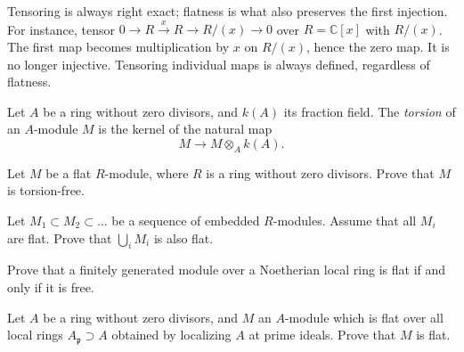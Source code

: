 Tensoring is always right exact; flatness
is what also preserves the first
injection. For instance, tensor
$0\to R\xrightarrow{x}R\to R/(x)\to0$
over $R=\mathbb{C}[x]$ with $R/(x)$.
The first map becomes multiplication by
$x$ on $R/(x)$, hence the zero map.
It is no longer injective.
Tensoring individual maps is always
defined, regardless of flatness.

\begin{definition}
\label{definition-torsion-module}
Let $A$ be a ring without zero divisors,
and $k(A)$ its fraction field.
The {\it torsion} of an $A$-module $M$
is the kernel of the natural map
$$
M \to M \otimes_A k(A).
$$
\end{definition}

\begin{exercise}
\label{exercise-flat-modules-torsion-free}
Let $M$ be a flat $R$-module,
where $R$ is a ring without zero divisors.
Prove that $M$ is torsion-free.
\end{exercise}

\begin{exercise}
\label{exercise-union-flat-modules-flat}
Let
$
M_1 \subset M_2 \subset \ldots
$
be a sequence of embedded $R$-modules.
Assume that all $M_i$ are flat.
Prove that
$
\bigcup_i M_i
$
is also flat.
\end{exercise}

\begin{exercise}
\label{exercise-flat-finite-local-free}
Prove that a finitely generated module
over a Noetherian local ring is flat
if and only if it is free.
\end{exercise}

\begin{exercise}
\label{exercise-local-flat-implies-flat}
Let $A$ be a ring without zero divisors,
and $M$ an $A$-module
which is flat over all local rings
$A_\mathfrak{p} \supset A$
obtained by localizing $A$
at prime ideals.
Prove that $M$ is flat.
\end{exercise}

